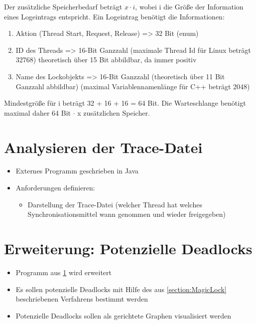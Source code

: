 \begin{itemize}
    Der zusätzliche Speicherbedarf beträgt $x \cdot i$, wobei i die Größe der
    Information eines Logeintrags entspricht. Ein Logeintrag benötigt die
    Informationen:
    \begin{enumerate}
      \item Aktion (Thread Start, Request, Release) => 32 Bit (enum)
      \item ID des Threads => 16-Bit Ganzzahl (maximale Thread Id für Linux
      beträgt 32768) theoretisch über 15 Bit abbildbar, da immer positiv
      \item Name des Lockobjekts => 16-Bit Ganzzahl (theoretisch über 11 Bit
      Ganzzahl abbildbar) (maximal Variablennamenlänge für C++ beträgt 2048)
    \end{enumerate}
    Mindestgröße für i beträgt 32 + 16 + 16 = 64 Bit. Die Warteschlange benötigt
    maximal daher 64 Bit $\cdot$ x zusätzlichen Speicher.
\end{itemize}

\section{Analysieren der Trace-Datei}
\label{section:Analysieren der Trace-Datei}
\begin{itemize}
  \item Externes Programm geschrieben in Java
  \item Anforderungen definieren:
  \begin{itemize}
    \item Darstellung der Trace-Datei (welcher Thread hat welches
    Synchronisationsmittel wann genommen und wieder freigegeben) 
  \end{itemize}
\end{itemize}

\section{Erweiterung: Potenzielle Deadlocks}
\label{section:Erweiterung: Potenzielle Deadlocks}
\begin{itemize}
  \item Programm aus \cref{section:Analysieren der Trace-Datei} wird erweitert
  \item Es sollen potenzielle Deadlocks mit Hilfe des aus \cref{section:MagicLock}
 beschriebenen Verfahrens bestimmt werden
  \item Potenzielle Deadlocks sollen als gerichtete Graphen visualisiert werden
\end{itemize}